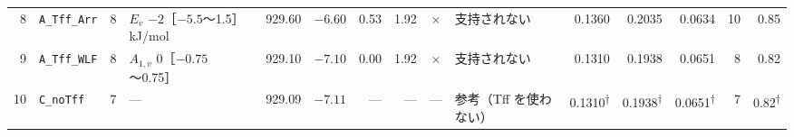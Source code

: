 \documentclass[paper=a4paper,landscape,fontsize=10pt,line_length=62zw,number_of_lines=34]{jlreq}
\begin{document}
\begin{table}[H]
\begin{tabular}{rlrp{12\zw}rrrrcp{8.5\zw}rrrrr}
8 & \texttt{A\_\allowbreak{}Tff\_\allowbreak{}Arr} & 8 & $E_v$ $-2$［$-5.5$〜1.5］ kJ/mol & 929.60 & $-6.60$ & 0.53 & 1.92 & × & 支持されない & 0.1360 & 0.2035 & 0.0634 & 10 & 0.85 \\
9 & \texttt{A\_\allowbreak{}Tff\_\allowbreak{}WLF} & 8 & $A_{1,v}$ 0［$-0.75$〜0.75］ & 929.10 & $-7.10$ & 0.00 & 1.92 & × & 支持されない & 0.1310 & 0.1938 & 0.0651 & 8 & 0.82 \\
10 & \texttt{C\_\allowbreak{}noTff} & 7 & --- & 929.09 & $-7.11$ & --- & --- & --- & 参考（Tff を使わない） & 0.1310\textsuperscript{†} & 0.1938\textsuperscript{†} & 0.0651\textsuperscript{†} & 7 & 0.82\textsuperscript{†} \\
\bottomrule
\end{tabular}
\end{table}
\end{document}
